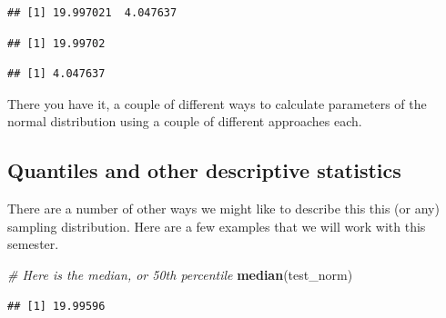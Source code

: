 \documentclass[
]{book}
\newenvironment{Shaded}{\begin{snugshade}}{\end{snugshade}}
\newcommand{\CommentTok}[1]{\textcolor[rgb]{0.56,0.35,0.01}{\textit{#1}}}
\newcommand{\DataTypeTok}[1]{\textcolor[rgb]{0.13,0.29,0.53}{#1}}
\newcommand{\DecValTok}[1]{\textcolor[rgb]{0.00,0.00,0.81}{#1}}
\newcommand{\FloatTok}[1]{\textcolor[rgb]{0.00,0.00,0.81}{#1}}
\newcommand{\KeywordTok}[1]{\textcolor[rgb]{0.13,0.29,0.53}{\textbf{#1}}}
\newcommand{\NormalTok}[1]{#1}
\newcommand{\OperatorTok}[1]{\textcolor[rgb]{0.81,0.36,0.00}{\textbf{#1}}}
\begin{document}
\begin{verbatim}
## [1] 19.997021  4.047637
\end{verbatim}

\begin{Shaded}
\end{Shaded}

\begin{verbatim}
## [1] 19.99702
\end{verbatim}

\begin{Shaded}
\end{Shaded}

\begin{verbatim}
## [1] 4.047637
\end{verbatim}

There you have it, a couple of different ways to calculate parameters of the normal distribution using a couple of different approaches each.

\hypertarget{quantiles-and-other-descriptive-statistics}{%
\subsection{Quantiles and other descriptive statistics}\label{quantiles-and-other-descriptive-statistics}}

There are a number of other ways we might like to describe this this (or any) sampling distribution. Here are a few examples that we will work with this semester.

\begin{Shaded}
\begin{Highlighting}[]
\CommentTok{# Here is the median, or 50th percentile}
\KeywordTok{median}\NormalTok{(test_norm) }
\end{Highlighting}
\end{Shaded}

\begin{verbatim}
## [1] 19.99596
\end{verbatim}

\begin{Shaded}
\end{Shaded}
\end{document}
